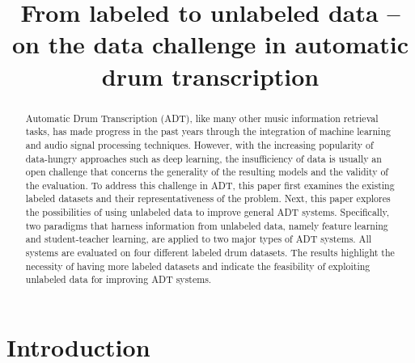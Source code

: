 \documentclass{article}
\title{From labeled to unlabeled data -- on the data challenge in automatic drum transcription}
\begin{document}
%
\maketitle
%
\begin{abstract}
Automatic Drum Transcription (ADT), like many other music information retrieval tasks, has made progress in the past years through the integration of machine learning and audio signal processing techniques. However, with the increasing popularity of data-hungry approaches such as deep learning, the insufficiency of data is usually an open challenge that concerns the generality of the resulting models and the validity of the evaluation. To address this challenge in ADT, this paper first examines the existing labeled datasets and their representativeness of the problem. Next, this paper explores the possibilities of using unlabeled data to improve general ADT systems. Specifically, two paradigms that harness information from unlabeled data, namely feature learning and student-teacher learning, are applied to two major types of ADT systems. All systems are evaluated on four different labeled drum datasets. The results highlight the necessity of having more labeled datasets and indicate the feasibility of exploiting unlabeled data for improving ADT systems.\\
\end{abstract}

%
\section{Introduction}\label{sec:introduction}
\end{document}
